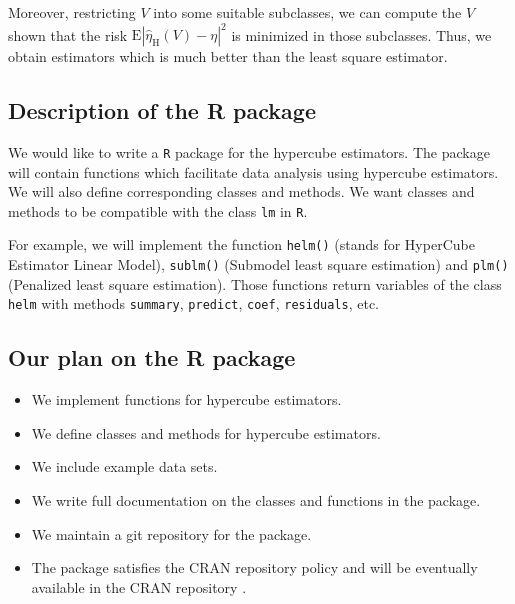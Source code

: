 \documentclass[draft]{article}
\begin{document}
Moreover, restricting $V$ into some suitable subclasses, we can compute the $V$ shown that the risk $\text{E} | \hat{\eta}_\text{H}(V) - \eta|^2$ is minimized in those subclasses. Thus, we obtain estimators which is much better than the least square estimator. 

\subsection{Description of the R package}

We would like to write a {\tt R} package for the hypercube estimators. The package will contain functions which facilitate data analysis using hypercube estimators. We will also define corresponding classes and methods. We want classes and methods to be compatible with the class {\tt lm} in {\tt R}.

For example, we will implement the function \texttt{helm()} (stands for HyperCube Estimator Linear Model), \texttt{sublm()} (Submodel least square estimation) and \texttt{plm()} (Penalized least square estimation). Those functions return variables of the class {\tt helm} with methods {\tt summary}, {\tt predict}, {\tt coef}, {\tt residuals}, etc.

\subsection{Our plan on the R package}

\begin{itemize}

	\item We implement functions for hypercube estimators.

	\item We define classes and methods for hypercube estimators.

	\item We include example data sets.

	\item We write full documentation on the classes and functions in the package.

	\item We maintain a git repository for the package.

	\item The package satisfies the CRAN repository policy and will be eventually available in the CRAN repository .

\end{itemize}
\end{document}
